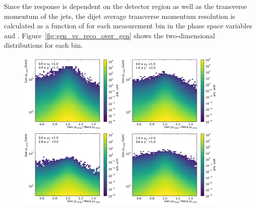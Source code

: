 Since the response is dependent on the detector region as well as the transverse
momentum of the jets, the dijet average transverse momentum resolution is
calculated as a function of \ptavggen for each measurement bin in the phase
space variables \ystar and \yboost. Figure~\ref{fig:gen_vs_reco_over_gen} shows the
two-dimensional distributions for each bin.

\begin{figure}[htbp]
    \centering
    \includegraphics[width=0.45\textwidth]{figures/measurement/gen_vs_reco_vs_gen_ptavg_yb0ys0.pdf}\hfill
    \includegraphics[width=0.45\textwidth]{figures/measurement/gen_vs_reco_vs_gen_ptavg_yb0ys1.pdf}
    \includegraphics[width=0.45\textwidth]{figures/measurement/gen_vs_reco_vs_gen_ptavg_yb0ys2.pdf}\hfill
    \includegraphics[width=0.45\textwidth]{figures/measurement/gen_vs_reco_vs_gen_ptavg_yb1ys0.pdf}

\end{figure}
